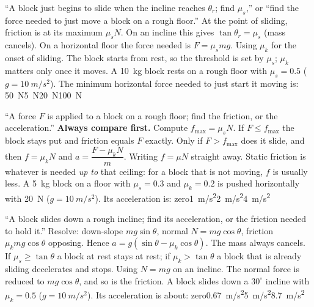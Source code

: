 {``A block just begins to slide when the incline reaches $\theta_r$; find $\mu_s$,'' or ``find the
force needed to just move a block on a rough floor.''}
{At the point of sliding, friction is at its maximum $\mu_sN$. On an incline this gives
$\tan\theta_r=\mu_s$ (mass cancels). On a horizontal floor the force needed is $F=\mu_s mg$.}
{Using $\mu_k$ for the onset of sliding. The block starts from rest, so the threshold is set by
$\mu_s$; $\mu_k$ matters only once it moves.}
{A \SI{10}{kg} block rests on a rough floor with $\mu_s=0.5$ ($g=\SI{10}{m/s^2}$). The minimum horizontal force
needed to just start it moving is:}
{\SI{50}{N}}{\SI{5}{N}}{\SI{20}{N}}{\SI{100}{N}}

{``A force $F$ is applied to a block on a rough floor; find the friction, or the acceleration.''}
{\textbf{Always compare first.} Compute $f_{\max}=\mu_sN$. If $F\le f_{\max}$ the block stays put and
friction equals $F$ exactly. Only if $F>f_{\max}$ does it slide, and then $f=\mu_kN$ and
$a=\dfrac{F-\mu_kN}{m}$.}
{Writing $f=\mu N$ straight away. Static friction is whatever is needed \emph{up to} that ceiling: for
a block that is not moving, $f$ is usually less.}
{A \SI{5}{kg} block on a floor with $\mu_s=0.3$ and $\mu_k=0.2$ is pushed horizontally with \SI{20}{N}
($g=\SI{10}{m/s^2}$). Its acceleration is:}
{zero}{\SI{1}{m/s^2}}{\SI{2}{m/s^2}}{\SI{4}{m/s^2}}

{``A block slides down a rough incline; find its acceleration, or the friction needed to hold it.''}
{Resolve: down-slope $mg\sin\theta$, normal $N=mg\cos\theta$, friction $\mu_k mg\cos\theta$ opposing.
Hence $a=g(\sin\theta-\mu_k\cos\theta)$. The mass always cancels. If $\mu_s\ge\tan\theta$ a block at rest
stays at rest; if $\mu_k>\tan\theta$ a block that is already sliding decelerates and stops.}
{Using $N=mg$ on an incline. The normal force is reduced to $mg\cos\theta$, and so is the friction.}
{A block slides down a $30^\circ$ incline with $\mu_k=0.5$ ($g=\SI{10}{m/s^2}$). Its acceleration is
about:}
{zero}{\SI{0.67}{m/s^2}}{\SI{5}{m/s^2}}{\SI{8.7}{m/s^2}}

